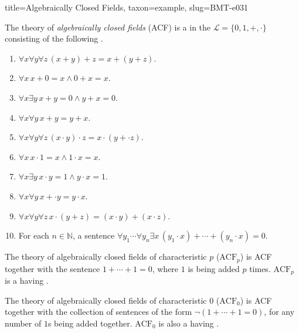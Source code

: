 \documentclass[a4paper]{article}
\begin{document}
  
\begin{tree}{title={Algebraically Closed Fields}, taxon={example}, slug={BMT-e031}}

    The theory of \emph{algebraically closed fields} (ACF) is a  in the  \(\mathcal  L= \{ 0,1,+, \cdot \}\)
    consisting of the following .
    \begin{enumerate}
\item{\(\forall  x \forall  y \forall  z \, (x+y)+z=x+(y+z)\).
        }
        \item{\(\forall  x \, x+0=x \land0 +x=x\).
        }
        \item{\(\forall  x \exists  y \, x+y=0 \land  y+x=0\).
        }
        \item{\(\forall  x \forall  y \, x+y=y+x\).
        }
        \item{\(\forall  x \forall  y \forall  z \, (x \cdot  y) \cdot  z=x \cdot  (y+ \cdot  z)\).
        }
        \item{\(\forall  x \, x \cdot1 =x \land1 \cdot  x=x\).
        }
        \item{\(\forall  x \exists  y \, x \cdot  y=1 \land  y \cdot  x=1\).
        }
        \item{\(\forall  x \forall  y \, x+ \cdot  y=y \cdot  x\).
        }
        \item{\(\forall  x \forall  y \forall  z \, x \cdot (y+z)=(x \cdot  y)+(x \cdot  z)\).
        }
        \item{
            For each \(n \in \mathbb  N\), a sentence \(\forall  y_1 \cdots \forall  y_n \exists  x \, (y_1 \cdot  x)+ \cdots +(y_n \cdot  x)=0\).
        }
\end{enumerate}\par{
    The theory of algebraically closed fields of characteristic \(p\) (\(\text {ACF}_p\)) is ACF together with the sentence
    \(1+ \cdots +1=0\), where \(1\) is being added \(p\) times. \(\text {ACF}_p\) is a  having
    .
}\par{
    The theory of algebraically closed fields of characteristic \(0\) (\(\text {ACF}_0\)) is ACF together with the collection of sentences
    of the form \(\neg (1+ \cdots +1=0)\), for any number of \(1\)s being added together. \(\text {ACF}_0\) is also a
     having .
}
\end{tree}
\end{document}
